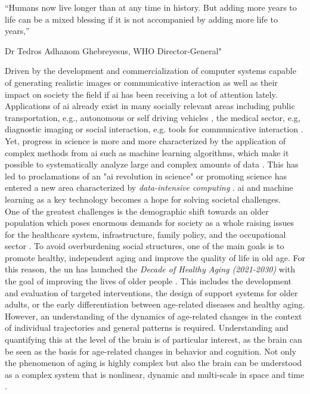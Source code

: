 \setlength{\epigraphwidth}{0.6\textwidth}
\epigraph{\centering “Humans now live longer than at any time in history. But adding more years to life can be a mixed blessing if it is not accompanied by adding more life to years,”} {Dr Tedros Adhanom Ghebreyesus, WHO Director-General"}
 
Driven by the development and commercialization of computer systems capable of generating realistic images or communicative interaction as well as their impact on society \cite{lin2023} the field if \gls{ai} has been receiving a lot of attention lately. Applications of \gls{ai} already exist in many socially relevant areas including public transportation, e.g., autonomous or self driving vehicles \cite{Leonard2020}, the medical sector, e.g, diagnostic imaging \cite{Liu2020} or social interaction, e.g. tools for communicative interaction \cite{Adamopoulou2020}. Yet, progress in science is more and more characterized by the application of complex methods from \gls{ai} such as machine learning algorithms, which make it possible to systematically analyze large and complex amounts of data \cite{Brunton2019}. This has led to proclamations of an "\gls{ai} revolution in science" \cite{Appenzeller2017} or promoting science has entered a new area characterized by \textit{data-intensive computing} \cite{Hey2009}. \Gls{ai} and machine learning as a key technology becomes a hope for solving societal challenges.\\
One of the greatest challenges is the demographic shift towards an older population which poses enormous demands for society as a whole raising issues for the healthcare system, infrastructure, family policy, and the occupational sector \cite{who_aging2023}. To avoid overburdening social structures, one of the main goals is to promote healthy, independent aging and improve the quality of life in old age. For this reason, the \gls{un} has launched the \textit{Decade of Healthy Aging (2021-2030)} with the goal of improving the lives of older people \cite{who_decade_ha2020}. This includes the development and evaluation of targeted interventions, the design of support systems for older adults, or the early differentiation between age-related diseases and healthy aging. However, an understanding of the dynamics of age-related changes in the context of individual trajectories and general patterns is required. Understanding and quantifying this at the level of the brain is of particular interest, as the brain can be seen as the basis for age-related changes in behavior and cognition. Not only the phenomenon of aging is highly complex but also the brain can be understood as a complex system that is nonlinear, dynamic and multi-scale in space and time \cite{Betzel2017}.\\ 
